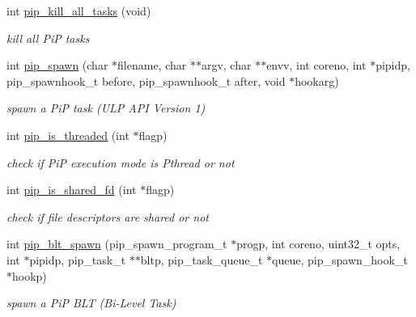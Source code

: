 \begin{DoxyCompactItemize}
\item 
int \hyperlink{group__libpip_gab7ba5cc62101240c68acf07905e36772}{pip\-\_\-kill\-\_\-all\-\_\-tasks} (void)
\begin{DoxyCompactList}\small\item\em kill all Pi\-P tasks \end{DoxyCompactList}\end{DoxyCompactItemize}
\begin{DoxyCompactItemize}
\item 
int \hyperlink{group__libpip_gae9187ea22ecf0623fa3ecfba5337f52d}{pip\-\_\-spawn} (char $\ast$filename, char $\ast$$\ast$argv, char $\ast$$\ast$envv, int coreno, int $\ast$pipidp, pip\-\_\-spawnhook\-\_\-t before, pip\-\_\-spawnhook\-\_\-t after, void $\ast$hookarg)
\begin{DoxyCompactList}\small\item\em spawn a Pi\-P task (U\-L\-P A\-P\-I Version 1) \end{DoxyCompactList}\end{DoxyCompactItemize}
\begin{DoxyCompactItemize}
\item 
int \hyperlink{group__libpip_ga0455093d5040ae45585cc88a5f3f002b}{pip\-\_\-is\-\_\-threaded} (int $\ast$flagp)
\begin{DoxyCompactList}\small\item\em check if Pi\-P execution mode is Pthread or not \end{DoxyCompactList}\end{DoxyCompactItemize}
\begin{DoxyCompactItemize}
\item 
int \hyperlink{group__libpip_ga180ece8f3f537d84db8e70921f3ae099}{pip\-\_\-is\-\_\-shared\-\_\-fd} (int $\ast$flagp)
\begin{DoxyCompactList}\small\item\em check if file descriptors are shared or not \end{DoxyCompactList}\end{DoxyCompactItemize}
\begin{DoxyCompactItemize}
\item 
int \hyperlink{group__libpip_gaceaa2ec686f001439d6ea89d47e71f65}{pip\-\_\-blt\-\_\-spawn} (pip\-\_\-spawn\-\_\-program\-\_\-t $\ast$progp, int coreno, uint32\-\_\-t opts, int $\ast$pipidp, pip\-\_\-task\-\_\-t $\ast$$\ast$bltp, pip\-\_\-task\-\_\-queue\-\_\-t $\ast$queue, pip\-\_\-spawn\-\_\-hook\-\_\-t $\ast$hookp)
\begin{DoxyCompactList}\small\item\em spawn a Pi\-P B\-L\-T (Bi-\/\-Level Task) \end{DoxyCompactList}\end{DoxyCompactItemize}
